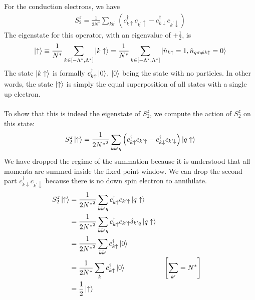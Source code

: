 \documentclass[twoside,11pt]{report}
\numberwithin{equation}{section}
\begin{document}
For the conduction electrons, we have
\begin{equation}\begin{aligned}
	S_2^z = \frac{1}{2N^*}\sum_{kk^\prime}\left(c^\dagger_{k \uparrow}c_{k^\prime \uparrow} - c^\dagger_{k \downarrow}c_{k^\prime \downarrow}\right)
\end{aligned}\end{equation}
The eigenstate for this operator, with an eigenvalue of \(+ \frac{1}{2}\), is
\begin{equation}\begin{aligned}
\ket{\uparrow} \equiv \frac{1}{N^*}\sum_{k \in \left[-\Lambda^*, \Lambda^*\right]} \ket{k \uparrow} = \frac{1}{N^*}\sum_{k \in \left[-\Lambda^*, \Lambda^*\right]}\ket{\hat n_{k \uparrow} = 1, \hat n_{q\sigma \neq k \uparrow} = 0}
\end{aligned}\end{equation}
The state \(\ket{k \uparrow}\) is formally \(c^\dagger_{k \uparrow} \ket{0}\), \(\ket{0}\) being the state with no particles. In other words, the state \(\ket{\uparrow}\) is simply the equal superposition of all states with a single up electron.
\\\\To show that this is indeed the eigenstate of \(S^z_2\), we compute the action of \(S_2^z\) on this state:
\begin{equation}\begin{aligned}
	S_2^z \ket{\uparrow} = \frac{1}{2{N^*}^2}\sum_{kk^\prime q}\left(c^\dagger_{k \uparrow}c_{k^\prime \uparrow} - c^\dagger_{k \downarrow}c_{k^\prime \downarrow}\right)\ket{q \uparrow}
\end{aligned}\end{equation}
We have dropped the regime of the summation because it is understood that all momenta are summed inside the fixed point window. We can drop the second part \(c^\dagger_{k \downarrow}c_{k^\prime \downarrow}\) because there is no down spin electron to annihilate.
\begin{equation}\begin{aligned}
	S_2^z \ket{\uparrow} &= \frac{1}{2{N^*}^2}\sum_{kk^\prime q}c^\dagger_{k \uparrow}c_{k^\prime \uparrow}\ket{q \uparrow}\\
			     &=\frac{1}{2{N^*}^2}\sum_{kk^\prime q}c^\dagger_{k \uparrow}c_{k^\prime \uparrow}\delta_{k^\prime q}\ket{q \uparrow}\\
			     &=\frac{1}{2{N^*}^2}\sum_{kk^\prime}c^\dagger_{k \uparrow}\ket{0}\\
			     &=\frac{1}{2{N^*}}\sum_{k}c^\dagger_{k \uparrow}\ket{0} && \left[\sum_{k^\prime} = N^*\right] \\
			     &=\frac{1}{2}\ket{ \uparrow}
\end{aligned}\end{equation}
\end{document}
